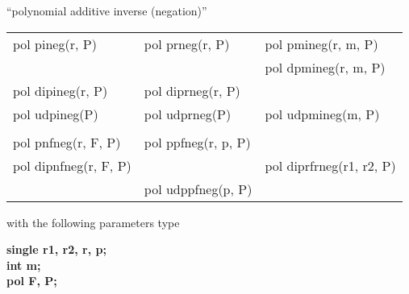 %
%

\begin{center} ``polynomial additive inverse (negation)'' \end{center}
\begin{center}
{\bf
\begin{tabular}{lll}
pol pineg(r, P)   & pol prneg(r, P)   & pol pmineg(r, m, P)  \\
                  &                   & pol dpmineg(r, m, P) \\
pol dipineg(r, P) & pol diprneg(r, P) &\\
pol udpineg(P)    & pol udprneg(P)    & pol udpmineg(m, P)   \\
&&\\
pol pnfneg(r, F, P)   & pol ppfneg(r, p, P) &\\
pol dipnfneg(r, F, P) &                     & pol diprfrneg(r1, r2, P)\\
                      & pol udppfneg(p, P)  &\\
\end{tabular} }
\end{center}
\parbox[t]{2.5in}{with the following parameters type}
\parbox[t]{3.0in}{\bf single r1, r2, r, p;\\
                      int m;\\
                      pol F, P;}

